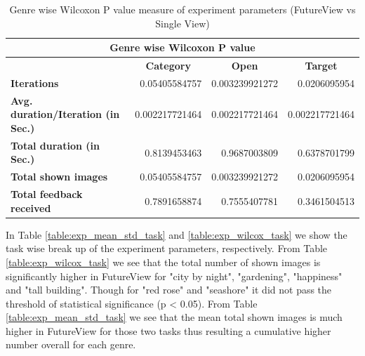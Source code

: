 \documentclass[english]{tktltiki}
\begin{document}
\begin{table}
	\small
	\begin{center}
    \begin{tabular}{|l|r|r|r|}
        \hline
        \multicolumn{4}{|c|}{\textbf{Genre wise Wilcoxon P value}} \\
        \hline
        
        \multicolumn{1}{|c|}{} & \multicolumn{1}{|c|}{\textbf{Category}} & \multicolumn{1}{|c|}{\textbf{Open}} & \multicolumn{1}{|c|}{\textbf{Target}} \\
        \hline
        
        
        
        \multicolumn{1}{|l|}{\textbf{Iterations}} & 0.05405584757 & 0.003239921272 & 0.0206095954 \\
        \hline
        
        \multicolumn{1}{|l|}{\textbf{Avg. duration/Iteration (in Sec.)}} & 0.002217721464 & 0.002217721464 & 0.002217721464 \\
        \hline
        
        \multicolumn{1}{|l|}{\textbf{Total duration (in Sec.)}} & 0.8139453463 & 0.9687003809 & 0.6378701799 \\
        \hline
        
        \multicolumn{1}{|l|}{\textbf{Total shown images}} & 0.05405584757 & 0.003239921272 & 0.0206095954 \\
        \hline
        
        \multicolumn{1}{|l|}{\textbf{Total feedback received}} & 0.7891658874 & 0.7555407781 & 0.3461504513 \\
        \hline
        
    \end{tabular}
	\end{center}
	\caption{Genre wise Wilcoxon P value measure of experiment parameters (FutureView vs Single View)}
    \label{table:exp_wilcoxon_genre}
\end{table}

 In Table \ref{table:exp_mean_std_task} and \ref{table:exp_wilcox_task} we show the task wise break up of the experiment parameters, respectively. From Table \ref{table:exp_wilcox_task} we see that the total number of shown images is significantly higher in FutureView for "city by night", "gardening", "happiness" and "tall building". Though for "red rose" and "seashore" it did not pass the threshold of statistical significance (p < 0.05). From Table \ref{table:exp_mean_std_task} we see that the mean total shown images is much higher in FutureView for those two tasks thus resulting a cumulative higher number overall for each genre.
\end{document}
